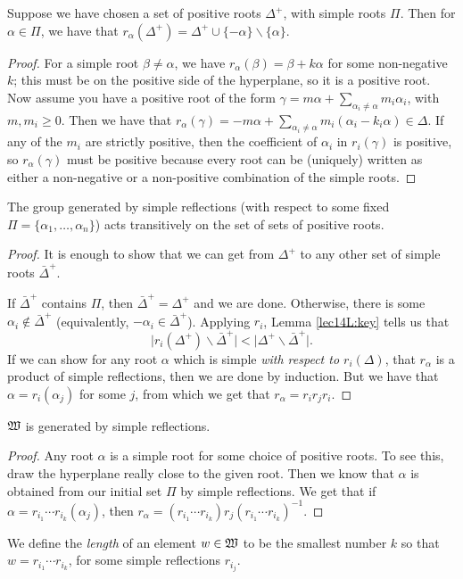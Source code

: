  \begin{lemma}\label{lec14L:key}
 Suppose we have chosen a set of positive roots $\Delta^+$, with simple roots $\Pi$.
 Then for $\alpha\in \Pi$, we have that $r_\alpha(\Delta^+)= \Delta^+ \cup \{-\alpha\}
 \smallsetminus \{\alpha\}$.
 \end{lemma}
 \begin{proof}
 For a simple root $\beta\neq \alpha$, we have $r_\alpha(\beta) = \beta + k\alpha$ for
 some non-negative $k$; this must be on the positive side of the hyperplane, so it is
 a positive root. Now assume you have a positive root of the form $\gamma = m\alpha +
 \sum_{\alpha_i\neq \alpha} m_i \alpha_i$, with $m,m_i\ge 0$. Then we have that
 $r_\alpha (\gamma) = -m\alpha + \sum_{\alpha_i\neq \alpha} m_i(\alpha_i-k_i\alpha)
 \in \Delta$. If any of the $m_i$ are strictly positive, then the coefficient of
 $\alpha_i$ in $r_i(\gamma)$ is positive, so $r_\alpha(\gamma)$ must be positive
 because every root can be (uniquely) written as either a non-negative or a
 non-positive combination of the simple roots.
 \end{proof}

 \begin{proposition}\label{lec14P:tansitive}
   The group generated by simple reflections (with respect to some fixed
   $\Pi=\{\alpha_1,\dots, \alpha_n\}$) acts transitively on the set of sets of positive
   roots.
 \end{proposition}
 \begin{proof}
   It is enough to show that we can get from $\Delta^+$ to any other set of simple
   roots $\bar\Delta^+$.

   If $\bar\Delta^+$ contains $\Pi$, then $\bar\Delta^+=\Delta^+$ and we are done.
   Otherwise, there is some $\alpha_i\not\in \bar\Delta^+$ (equivalently,
   $-\alpha_i\in \bar\Delta^+$). Applying $r_i$, Lemma \ref{lec14L:key} tells us that
   \[
     \bigl|r_i(\Delta^+)\smallsetminus \bar\Delta^+\bigr|<
     \bigl|\Delta^+\smallsetminus \bar\Delta^+\bigr|.
   \]
   If we can show for any root $\alpha$ which is simple
   \emph{with respect to $r_i(\Delta)$}, that $r_\alpha$ is a product of simple
   reflections, then we are done by induction. But we have that $\alpha =
   r_i(\alpha_j)$ for some $j$, from which we get that $r_\alpha=r_ir_jr_i$.
 \end{proof}
 \begin{corollary}
   $\mathfrak{W}$ is generated by simple reflections.
 \end{corollary}
 \begin{proof}
   Any root $\alpha$ is a simple root for some choice of positive roots. To see this,
   draw the hyperplane really close to the given root. Then we know that $\alpha$ is
   obtained from our initial set $\Pi$ by simple reflections. We get that if $\alpha =
   r_{i_1}\cdots r_{i_k}(\alpha_j)$, then $r_\alpha = (r_{i_1}\cdots
   r_{i_k})r_j(r_{i_1}\cdots r_{i_k})^{-1}$.
 \end{proof}
 We define the \emph{length} of an element $w\in \mathfrak{W}$ to be the
 smallest number $k$ so that $w=r_{i_1}\cdots r_{i_k}$, for some simple reflections
 $r_{i_j}$.

